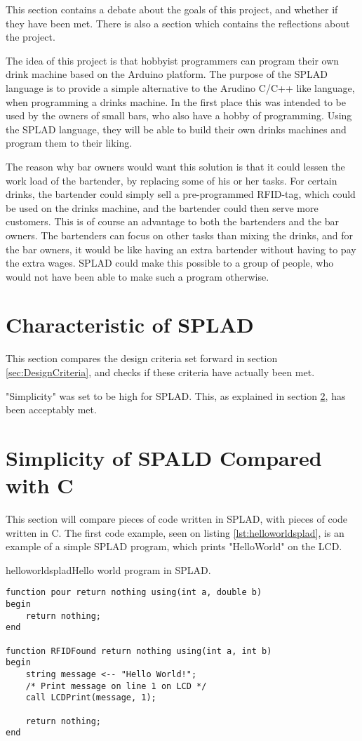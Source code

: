 This section contains a debate about the goals of this project, and whether if they have been met. There is also a section which contains the reflections about the project.

The idea of this project is that hobbyist programmers can program their own drink machine based on the Arduino platform. The purpose of the SPLAD language is to provide a simple alternative to the Arudino C/C++ like language, when programming a drinks machine. In the first place this was intended to be used by the owners of small bars, who also have a hobby of programming. Using the SPLAD language, they will be able to build their own drinks machines and program them to their liking.

The reason why bar owners would want this solution is that it could lessen the work load of the bartender, by replacing some of his or her tasks. For certain drinks, the bartender could simply sell a pre-programmed RFID-tag, which could be used on the drinks machine, and the bartender could then serve more customers. This is of course an advantage to both the bartenders and the bar owners. The bartenders can focus on other tasks than mixing the drinks, and for the bar owners, it would be like having an extra bartender without having to pay the extra wages. SPLAD could make this possible to a group of people, who would not have been able to make such a program otherwise.

\section{Characteristic of SPLAD}
This section compares the design criteria set forward in section \ref{sec:DesignCriteria}, and checks if these criteria have actually been met.

"Simplicity" was set to be high for SPLAD. This, as explained in section \ref{sec:simplespladc}, has been acceptably met. 

\section{Simplicity of SPALD Compared with C}
\label{sec:simplespladc}
This section will compare pieces of code written in SPLAD, with pieces of code written in C. The first code example, seen on listing \ref{lst:helloworldsplad}, is an example of a simple SPLAD program, which prints "HelloWorld" on the LCD.

\begin{code}{helloworldsplad}{Hello world program in SPLAD.}
\begin{lstlisting}
function pour return nothing using(int a, double b)
begin
	return nothing;
end

function RFIDFound return nothing using(int a, int b)
begin
	string message <-- "Hello World!";
	/* Print message on line 1 on LCD */
	call LCDPrint(message, 1);

	return nothing;
end
\end{lstlisting}
\end{code}

